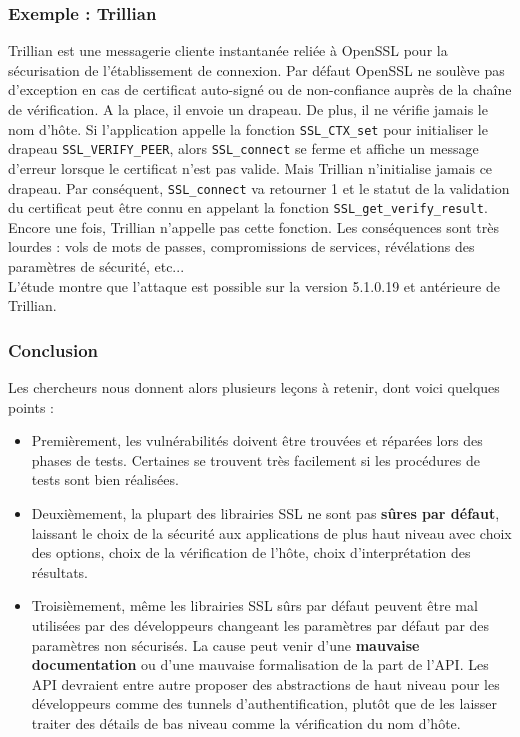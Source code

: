 \subsubsection{Exemple : Trillian}

Trillian est une messagerie cliente instantanée reliée à OpenSSL pour la sécurisation de l'établissement de connexion. Par défaut OpenSSL ne soulève pas d'exception en cas de certificat auto-signé ou de non-confiance auprès de la chaîne de vérification. A la place, il envoie un drapeau. De plus, il ne vérifie jamais le nom d'hôte. Si l'application appelle la fonction \texttt{SSL\_CTX\_set} pour initialiser le drapeau \texttt{SSL\_VERIFY\_PEER}, alors \texttt{SSL\_connect} se ferme et affiche un message d'erreur lorsque le certificat n'est pas valide. Mais Trillian n'initialise jamais ce drapeau. Par conséquent, \texttt{SSL\_connect} va retourner 1 et le statut de la validation du certificat peut être connu en appelant la fonction \texttt{SSL\_get\_verify\_result}. Encore une fois, Trillian n'appelle pas cette fonction. Les conséquences sont très lourdes : vols de mots de passes, compromissions de services, révélations des paramètres de sécurité, etc...\\


L'étude montre que l'attaque est possible sur la version 5.1.0.19 et antérieure de Trillian.

\subsubsection{Conclusion}

Les chercheurs nous donnent alors plusieurs leçons à retenir, dont voici quelques points :
\begin{itemize}
\item Premièrement, les vulnérabilités doivent être trouvées et réparées lors des phases de tests. Certaines se trouvent très facilement si les procédures de tests sont bien réalisées.
\item Deuxièmement, la plupart des librairies SSL ne sont pas \textbf{sûres par défaut}, laissant le choix de la sécurité aux applications de plus haut niveau avec choix des options, choix de la vérification de l'hôte, choix d'interprétation des résultats.
\item Troisièmement, même les librairies SSL sûrs par défaut peuvent être mal utilisées par des développeurs changeant les paramètres par défaut par des paramètres non sécurisés. La cause peut venir d'une \textbf{mauvaise documentation} ou d'une mauvaise formalisation de la part de l'API. Les API devraient entre autre proposer des abstractions de haut niveau pour les développeurs comme des tunnels d'authentification, plutôt que de les laisser traiter des détails de bas niveau comme la vérification du nom d'hôte.\\
\end{itemize}

